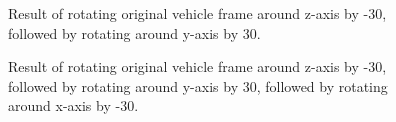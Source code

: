\documentclass{article}
\begin{document}
	\begin{figure}[!htbp]
		\centering
		\vspace{1cm}
		\vspace{-0.25cm}
		\caption{Result of rotating original vehicle frame around z-axis by -30\textdegree, followed by rotating around y-axis by 30\textdegree.}
	\end{figure}
	
	\newpage
	
	\begin{figure}[!htbp]
		\centering
		\vspace{1cm}
		\vspace{-0.5cm}
		\caption{Result of rotating original vehicle frame around z-axis by -30\textdegree, followed by rotating around y-axis by 30\textdegree, followed by rotating around x-axis by -30\textdegree.}
	\end{figure}
	
\end{document}
